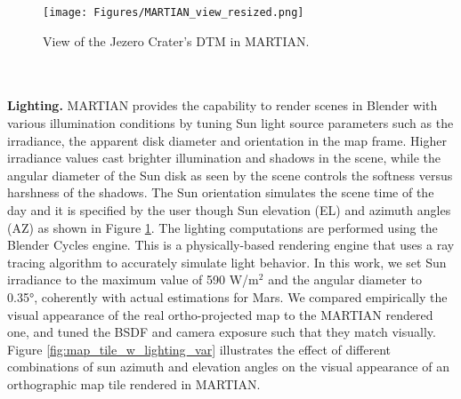 \begin{figure}
    \centering
    \texttt{[image: Figures/MARTIAN\_view\_resized.png]}  \caption{\label{fig:MARTIAN_view}View of the Jezero Crater's DTM in MARTIAN.}
\end{figure}
\\
\\
\noindent \textbf{Lighting.}
MARTIAN provides the capability to render scenes in Blender with various illumination conditions by tuning Sun light source parameters such as the irradiance, the apparent disk diameter and orientation in the map frame. Higher irradiance values cast brighter illumination and shadows in the scene, while the angular diameter of the Sun disk as seen by the scene controls the softness versus harshness of the shadows. The Sun orientation simulates the scene time of the day and it is specified by the user though Sun elevation (EL) and azimuth angles (AZ) as shown in Figure \ref{fig:MARTIAN_view}. The lighting computations are performed using the Blender Cycles engine. This is a physically-based rendering engine that uses a ray tracing algorithm to accurately simulate light behavior. 
In this work, we set Sun irradiance to the maximum value of 590 W/m$^2$ and the angular diameter to 0.35°, coherently with actual estimations for Mars.
We compared empirically the visual appearance of the real ortho-projected map to the MARTIAN rendered one, and tuned the BSDF and camera exposure such that they match visually. Figure \ref{fig:map_tile_w_lighting_var} illustrates the effect of different combinations of sun azimuth and elevation angles on the visual appearance of an orthographic map tile rendered in MARTIAN.

